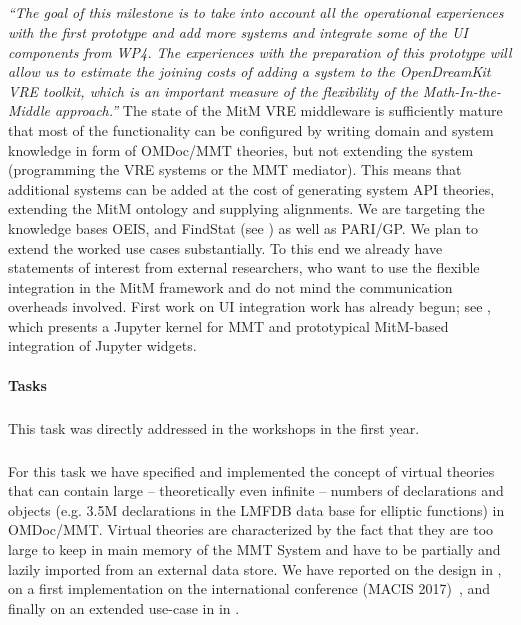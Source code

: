 \subparagraph{}
\emph{“The goal of this milestone is to take into account all the operational experiences with the first prototype and add more systems and integrate some of the UI components from WP4.
  The experiences with the preparation of this prototype will allow us to estimate the joining costs of adding a system to the OpenDreamKit VRE toolkit, which is an important measure of the flexibility of the Math-In-the-Middle approach.”}
The state of the MitM VRE middleware is sufficiently mature that most of the functionality can be configured by writing domain and system knowledge in form of OMDoc/MMT theories, but not extending the system (programming the VRE systems or the MMT mediator).
This means that additional systems can be added at the cost of generating system API theories, extending the  MitM ontology and supplying alignments.
We are targeting the knowledge bases OEIS, and FindStat (see ) as well as PARI/GP.
We plan to extend the worked use cases substantially.
To this end we already have statements of interest from external researchers, who want to use the flexible integration in the MitM framework and do not mind the communication overheads involved. 
First work on UI integration work has already begun; see  , which presents a Jupyter kernel for MMT and prototypical MitM-based integration of Jupyter widgets.

\paragraph{Tasks}
\medskip

\subparagraph{}
This task was directly addressed in the  workshops in the first year.
\medskip

\subparagraph{}
For this task we have specified and implemented the concept of virtual theories that can contain large -- theoretically even infinite -- numbers of declarations and objects (e.g. 3.5M declarations in the LMFDB data base for elliptic functions) in OMDoc/MMT.
Virtual theories are characterized by the fact that they are too large to keep in main memory of the MMT System and have to be partially and lazily imported from an external data store.
We have reported on the design in , on a first implementation on the international conference (MACIS 2017)~\cite{WieKohRab:vtuimkb17}, and finally on an extended use-case in \LMFDB in . 
\medskip

